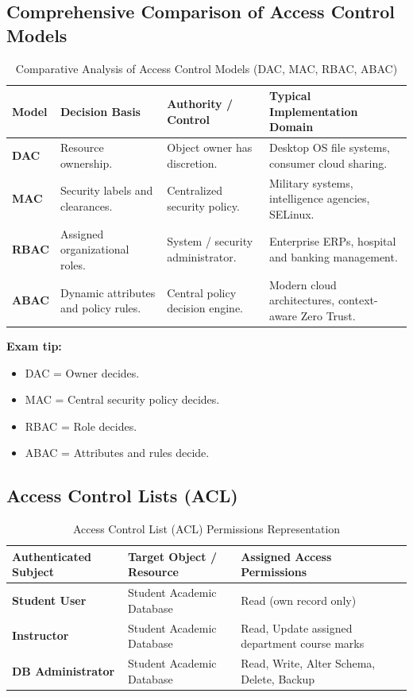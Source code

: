 \subsection{Comprehensive Comparison of Access Control Models}

\begin{table}[htbp]
\centering
\caption{Comparative Analysis of Access Control Models (DAC, MAC, RBAC, ABAC)}
\label{tab:access_control_models}
\begin{tabularx}{\textwidth}{p{1.8cm} p{3.8cm} p{3.8cm} X}
\toprule
\textbf{Model} & \textbf{Decision Basis} & \textbf{Authority / Control} & \textbf{Typical Implementation Domain} \\
\midrule
\textbf{DAC} & Resource ownership. & Object owner has discretion. & Desktop OS file systems, consumer cloud sharing. \\
\textbf{MAC} & Security labels and clearances. & Centralized security policy. & Military systems, intelligence agencies, SELinux. \\
\textbf{RBAC} & Assigned organizational roles. & System / security administrator. & Enterprise ERPs, hospital and banking management. \\
\textbf{ABAC} & Dynamic attributes and policy rules. & Central policy decision engine. & Modern cloud architectures, context-aware Zero Trust. \\
\bottomrule
\end{tabularx}
\end{table}


\textbf{Exam tip:}

\begin{itemize}
\item DAC = Owner decides.
\item MAC = Central security policy decides.
\item RBAC = Role decides.
\item ABAC = Attributes and rules decide.
\end{itemize}

\subsection{Access Control Lists (ACL)}

\begin{table}[htbp]
\centering
\caption{Access Control List (ACL) Permissions Representation}
\label{tab:acl_example}
\begin{tabularx}{\textwidth}{p{3.2cm} p{4.0cm} X}
\toprule
\textbf{Authenticated Subject} & \textbf{Target Object / Resource} & \textbf{Assigned Access Permissions} \\
\midrule
\textbf{Student User} & Student Academic Database & Read (own record only) \\
\textbf{Instructor} & Student Academic Database & Read, Update assigned department course marks \\
\textbf{DB Administrator} & Student Academic Database & Read, Write, Alter Schema, Delete, Backup \\
\bottomrule
\end{tabularx}
\end{table}

